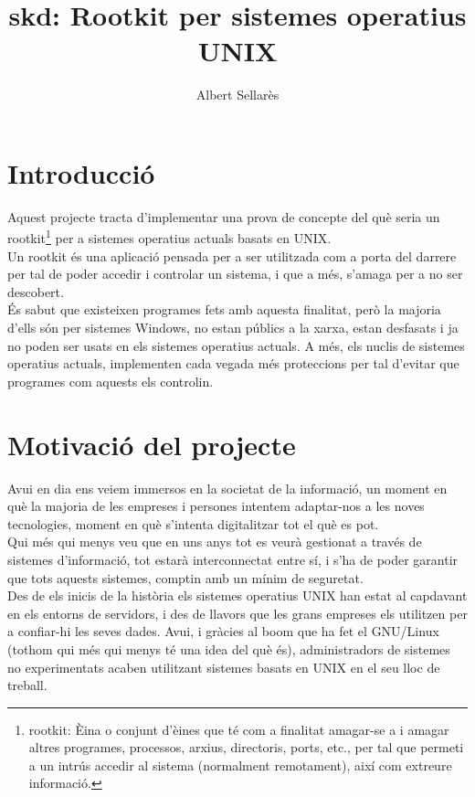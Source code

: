 \documentclass[a4paper]{article}
\author{Albert Sellarès}
\title{skd: Rootkit per sistemes operatius UNIX}
\begin{document}
\maketitle
\newpage


\section{Introducció}

Aquest projecte tracta d'implementar una prova de concepte del què seria un rootkit\footnote{rootkit:
Èina o conjunt d'èines que té com a finalitat amagar-se a i amagar altres programes, processos, arxius, 
directoris, ports, etc., per tal que permeti a un intrús accedir al sistema (normalment remotament), 
així com extreure informació.} per a sistemes operatius actuals basats en UNIX.\\ 
Un rootkit és una aplicació pensada per a ser utilitzada com a porta del darrere per tal de
poder accedir i controlar un sistema, i que a més, s'amaga per a no ser descobert.\\
És sabut que existeixen programes fets amb aquesta finalitat, però la majoria d'ells són
per sistemes Windows, no estan públics a la xarxa, estan desfasats i ja no poden ser
usats en els sistemes operatius actuals. A més, els nuclis de sistemes operatius actuals, implementen cada vegada més
proteccions per tal d'evitar que programes com aquests els controlin.

\section{Motivació del projecte}

Avui en dia ens veiem immersos en la societat de la informació, un moment en què la
majoria de les empreses i persones intentem adaptar-nos a les noves tecnologies,
moment en què s'intenta digitalitzar tot el què es pot.\\
Qui més qui menys veu que en uns anys tot es veurà gestionat a través de sistemes
d'informació, tot estarà interconnectat entre sí, i s'ha de poder garantir que tots aquests
sistemes, comptin amb un mínim de seguretat.\\
Des de els inicis de la història els sistemes operatius UNIX han estat al capdavant en els
entorns de servidors, i des de llavors que les grans empreses els utilitzen per a confiar-hi
les seves dades. Avui, i gràcies al boom que ha fet el GNU/Linux (tothom qui més qui
menys té una idea del què és), administradors de sistemes no experimentats acaben
utilitzant sistemes basats en UNIX en el seu lloc de treball.
\end{document}
